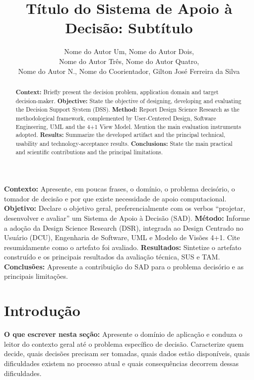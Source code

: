 \documentclass[12pt]{article}
\title{Título do Sistema de Apoio à Decisão: Subtítulo}
\author{Nome do Autor Um\inst{1}, Nome do Autor Dois\inst{1}, \\
Nome do Autor Três\inst{1}, Nome do Autor Quatro\inst{1}, \\
Nome do Autor N.\inst{1}, Nome do Coorientador\inst{2},
Gilton José Ferreira da Silva\inst{2}}
\begin{document}
\maketitle

\begin{abstract}
\textbf{Context:} Briefly present the decision problem, application domain and target decision-maker.
\textbf{Objective:} State the objective of designing, developing and evaluating the Decision Support System (DSS).
\textbf{Method:} Report Design Science Research as the methodological framework, complemented by User-Centered Design, Software Engineering, UML and the 4+1 View Model. Mention the main evaluation instruments adopted.
\textbf{Results:} Summarize the developed artifact and the principal technical, usability and technology-acceptance results.
\textbf{Conclusions:} State the main practical and scientific contributions and the principal limitations.
\end{abstract}

\begin{resumo}
\textbf{Contexto:} Apresente, em poucas frases, o domínio, o problema decisório, o tomador de decisão e por que existe necessidade de apoio computacional.
\textbf{Objetivo:} Declare o objetivo geral, preferencialmente com os verbos ``projetar, desenvolver e avaliar'' um Sistema de Apoio à Decisão (SAD).
\textbf{Método:} Informe a adoção da Design Science Research (DSR), integrada ao Design Centrado no Usuário (DCU), Engenharia de Software, UML e Modelo de Visões 4+1. Cite resumidamente como o artefato foi avaliado.
\textbf{Resultados:} Sintetize o artefato construído e os principais resultados da avaliação técnica, SUS e TAM.
\textbf{Conclusões:} Apresente a contribuição do SAD para o problema decisório e as principais limitações.
\end{resumo}

\section{Introdução}
\label{sec:introducao}

\textbf{O que escrever nesta seção:}
Apresente o domínio de aplicação e conduza o leitor do contexto geral até o problema específico de decisão. Caracterize quem decide, quais decisões precisam ser tomadas, quais dados estão disponíveis, quais dificuldades existem no processo atual e quais consequências decorrem dessas dificuldades.
\end{document}
